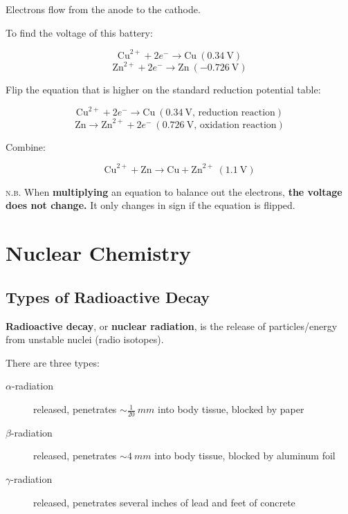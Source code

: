 \documentclass[a4paper, 12pt]{article}
\begin{document}
Electrons flow from the anode to the cathode.

To find the voltage of this battery:

$$\text{Cu}^{2+} + 2e^- \longrightarrow \text{Cu} \: (0.34 \: \text{V})$$
$$\text{Zn}^{2+} + 2e^- \longrightarrow \text{Zn} \: (-0.726 \: \text{V})$$

Flip the equation that is higher on the standard reduction potential table:

$$\text{Cu}^{2+} + 2e^- \longrightarrow \text{Cu} \: (0.34 \: \text{V, reduction reaction})$$
$$\text{Zn} \longrightarrow \text{Zn}^{2+} + 2e^- \: (0.726 \: \text{V, oxidation reaction})$$

Combine:

$$\text{Cu}^{2+} + \text{Zn} \longrightarrow \text{Cu} + \text{Zn}^{2+} \: \boxed{(1.1 \: \text{V})}$$

\textsc{n.b.} When \textbf{multiplying} an equation to balance out the electrons, \textbf{the voltage does not change.} It only changes in sign if the equation is flipped.

\section{Nuclear Chemistry}

\subsection{Types of Radioactive Decay}
\textbf{Radioactive decay}, or \textbf{nuclear radiation}, is the release of particles/energy from unstable nuclei (radio isotopes).

There are three types:

\begin{description}
\item [$\alpha$-radiation]  released, penetrates $\sim \frac{1}{20} \: mm$ into body tissue, blocked by paper
\item [$\beta$-radiation]  released, penetrates $\sim 4 \: mm$ into body tissue, blocked by aluminum foil
\item [$\gamma$-radiation]  released, penetrates several inches of lead and feet of concrete
\end{description}
\end{document}
